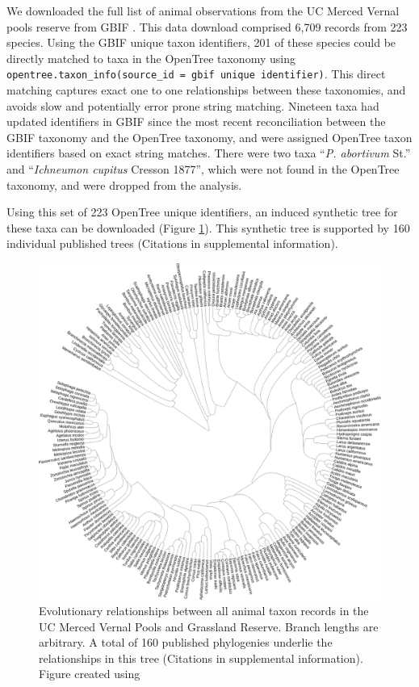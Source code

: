 \documentclass[oupdraft]{sysbio_sse}
\begin{document}
We downloaded the full list of animal observations from the UC Merced Vernal pools reserve from GBIF \citep{gbif_secretariat_gbif_2019}. This data download comprised 6,709 records from 223 species. Using the GBIF unique taxon identifiers, 201 of these species could be directly matched to taxa in the OpenTree taxonomy using \texttt{opentree.taxon\_info(source\_id = {gbif unique identifier})}. This direct matching captures exact one to one relationships between these taxonomies, and avoids slow and potentially error prone string matching. Nineteen taxa had updated identifiers in GBIF since the most recent reconciliation between the GBIF taxonomy and the OpenTree taxonomy, and were assigned OpenTree taxon identifiers based on exact string matches. There were two taxa ``\textit{P. abortivum} St.'' and ``\textit{Ichneumon cupitus} Cresson 1877'', which were not found in the OpenTree taxonomy, and were dropped from the analysis.


Using this set of 223 OpenTree unique identifiers, an induced synthetic tree for these taxa can be downloaded (Figure \ref{vernalanimals}). This synthetic tree is supported by 160 individual published trees (Citations in supplemental information).

\begin{figure}[!h]
\centering\includegraphics[width=\textwidth]{vernal_animals}
\caption{Evolutionary relationships between all animal taxon records in the UC Merced Vernal Pools and Grassland Reserve. Branch lengths are arbitrary. A total of 160 published phylogenies underlie the relationships in this tree (Citations in supplemental information). Figure created using \citep{letunic_interactive_2019}}
\label{vernalanimals}
\end{figure}
\end{document}

